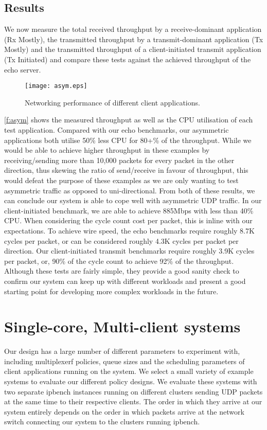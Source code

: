 \subsection{Results}
We now measure the total received throughput by a receive-dominant application (Rx Mostly), the
transmitted throughput by a transmit-dominant application (Tx Mostly) and the transmitted throughput
of a client-initiated transmit application (Tx Initiated) and compare these tests against the achieved
throughput of the echo server. 

\begin{figure}[h]
    \centering
    \texttt{[image: asym.eps]}
    \caption{Networking performance of different client applications.}
    \label{f:asym}
\end{figure}

\autoref{f:asym} shows the measured throughput as well as the CPU utilisation of each test application. 
Compared with our echo benchmarks, our asymmetric applications both utilise 50\% less CPU for 80+\% of the
throughput. While we would be able to achieve higher throughput in these examples by receiving/sending
more than 10,000 packets for every packet in the other direction, thus skewing the ratio of send/receive in favour of throughput,
this would defeat the purpose of these examples
as we are only wanting to test asymmetric traffic as opposed to uni-directional.
From both of these results, we can conclude our system is able to cope well with asymmetric UDP traffic. 
In our client-initiated benchmark, we are able to achieve 885Mbps with less than 40\% CPU. When considering
the cycle count cost per packet, this is inline with our expectations. To achieve wire speed, the echo benchmarks 
require roughly 8.7K cycles per packet, or can be considered roughly 4.3K cycles per packet per direction. Our client-initiated
transmit benchmarks require roughly 3.9K cycles per packet, or, 90\% of the cycle count to achieve 92\% of the throughput.
Although these tests are fairly simple, they provide a good sanity check to confirm our system can 
keep up with different workloads and present a good starting point for developing more complex workloads in the future.

\section{Single-core, Multi-client systems}

Our design has a large number of different parameters to experiment with, including multiplexerƒ
policies, queue sizes and the scheduling parameters of client applications running on the system. 
We select a small variety of example systems to evaluate our different policy designs. We evaluate
these systems with two separate ipbench instances running on different clusters sending UDP packets
at the same time to their respective clients. The order in which they arrive at our system entirely
depends on the order in which packets arrive at the network switch connecting our system to the clusters
running ipbench. 

